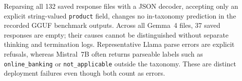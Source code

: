 Reparsing all 132 saved response files with a JSON decoder, accepting
only an explicit string-valued \texttt{product} field, changes no
in-taxonomy prediction in the recorded GGUF benchmark outputs.
Across all Gemma~4 files, 37 saved responses are empty; their causes
cannot be distinguished without separate thinking and termination logs.
Representative Llama parse errors are explicit refusals, whereas
Mistral~7B often returns parseable labels such as
\texttt{online\_banking} or \texttt{not\_applicable} outside the taxonomy.
These are distinct deployment failures even though both count as errors.
